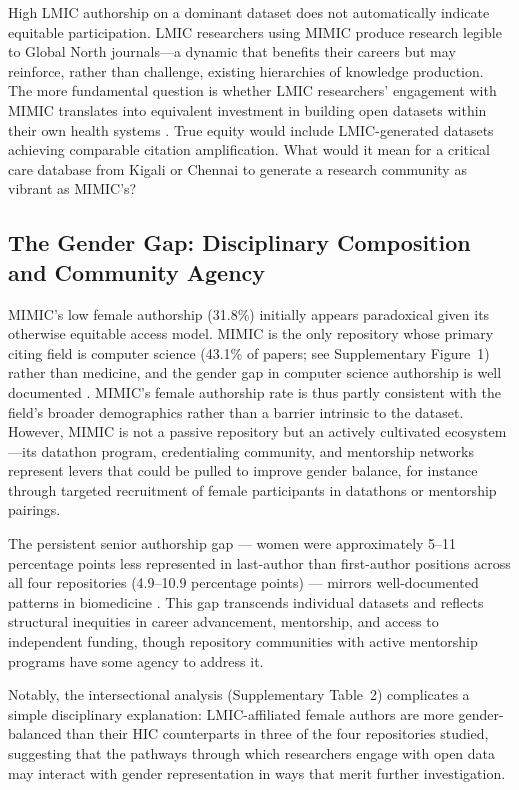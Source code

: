 \documentclass[11pt]{article}
\begin{document}
High LMIC authorship on a dominant dataset does not automatically indicate equitable participation.
LMIC researchers using MIMIC produce research legible to Global North journals---a dynamic that benefits their careers but may reinforce, rather than challenge, existing hierarchies of knowledge production. The more fundamental question is whether LMIC researchers' engagement with MIMIC translates into equivalent investment in building open datasets within their own health systems \cite{celi2022sources}.
True equity would include LMIC-generated datasets achieving comparable citation amplification. What would it mean for a critical care database from Kigali or Chennai to generate a research community as vibrant as MIMIC's?

\subsection{The Gender Gap: Disciplinary Composition and Community Agency}

MIMIC's low female authorship (31.8\%) initially appears paradoxical given its otherwise equitable access model.
MIMIC is the only repository whose primary citing field is computer science (43.1\% of papers; see Supplementary Figure~1) rather than medicine, and the gender gap in computer science authorship is well documented \cite{lariviere2013bibliometrics,lerchenmueller2018gender}.
MIMIC's female authorship rate is thus partly consistent with the field's broader demographics rather than a barrier intrinsic to the dataset.
However, MIMIC is not a passive repository but an actively cultivated ecosystem---its datathon program, credentialing community, and mentorship networks represent levers that could be pulled to improve gender balance, for instance through targeted recruitment of female participants in datathons or mentorship pairings.

The persistent senior authorship gap --- women were approximately 5--11 percentage points less represented in last-author than first-author positions across all four repositories (4.9--10.9 percentage points) --- mirrors well-documented patterns in biomedicine \cite{lariviere2013bibliometrics,sugimoto2023equity,vaduganathan2018gender}.
This gap transcends individual datasets and reflects structural inequities in career advancement, mentorship, and access to independent funding, though repository communities with active mentorship programs have some agency to address it.

Notably, the intersectional analysis (Supplementary Table~2) complicates a simple disciplinary explanation: LMIC-affiliated female authors are more gender-balanced than their HIC counterparts in three of the four repositories studied, suggesting that the pathways through which researchers engage with open data may interact with gender representation in ways that merit further investigation.
\end{document}
